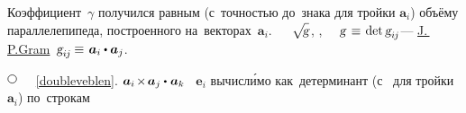 \begin{otherlanguage}{russian}
\vspace{-0.1em}\noindent
Коэффициент~$\gamma$ получился равным (с~точностью до~знака для  тройки ${\bm{a}_i}$) объёму параллелепипеда, построенного на~векторах~$\bm{a}_i$.
~  ~${\hspace{-.22ex}\sqrt{\hspace{-0.36ex}\mathstrut{\textsl{g}}}\hspace{.16ex}}$,  ,  ~\href{https://en.wikipedia.org/wiki/Gramian_matrix}{}~\hbox{$\textsl{g} \hspace{.1ex} \hspace{.25ex} \equiv \hspace{.2ex} \operatorname{det} \textsl{g}_{i\hspace{-0.1ex}j}$\hspace{-0.12ex}}\:---   \hbox{\href{https://en.wikipedia.org/wiki/J\%C3\%B8rgen_Pedersen_Gram}{J.\,P.\:Gram}}~${\textsl{g}_{i\hspace{-0.1ex}j} \hspace{-0.1ex} \equiv \hspace{.2ex} \bm{a}_i \dotp \bm{a}_j}$.

\noindent
${ \tikz[baseline=-1ex] \draw [line width=.5pt, color=black, fill=white] (0, 0) circle (.8ex);
\hspace{.6em} }$
 ~\eqref{doubleveblen}.
 ${\bm{a}_i \hspace{-0.25ex} \times \hspace{-0.25ex} \bm{a}_j \dotp \hspace{.1ex} \bm{a}_k}$ ~${\bm{e}_i}$ вычисл\'{и}мо как~детерминант (с~\inquotes{$-$} для  тройки ${\bm{a}_i}$) по~строкам


\end{otherlanguage}
